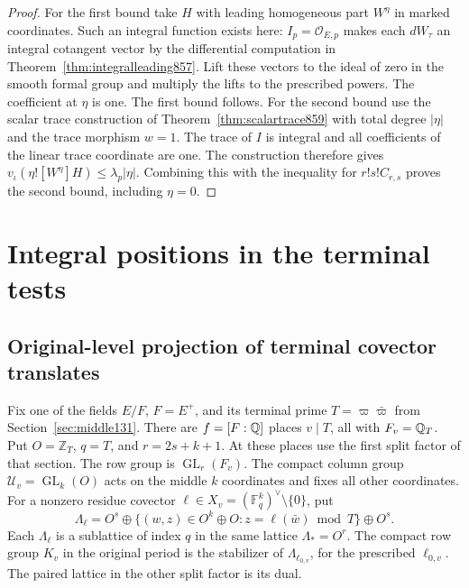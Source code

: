 \documentclass[a4paper,11pt]{article}
\theoremstyle{definition}
\theoremstyle{remark}
\newcommand{\ZZ}{\mathbb Z}\newcommand{\ord}{\operatorname{ord}}
\numberwithin{equation}{section}
\newcommand{\GL}{\operatorname{GL}}
\begin{document}
\begin{proof}
For the first bound take \(H\) with leading homogeneous part
\(W^\eta\) in marked coordinates. Such an integral function
exists here: \(I_p=\mathcal O_{E,p}\) makes each \(dW_\tau\)
an integral cotangent vector by the differential computation in
Theorem~\ref{thm:integralleading857}. Lift these vectors to the
ideal of zero in the smooth formal group and multiply the lifts
to the prescribed powers. The coefficient at \(\eta\) is one.
The first bound follows. For the second bound use the scalar
trace construction of Theorem~\ref{thm:scalartrace859} with
total degree \(|\eta|\) and the trace morphism \(w=1\).
The trace of \(I\) is integral and all coefficients of the
linear trace coordinate are one. The construction therefore
gives \(v_\iota(\eta![W^\eta]H)\le\lambda_p|\eta|\).
Combining this with the inequality for \(r!s!C_{r,s}\) proves
the second bound, including \(\eta=0\).
\end{proof}
\clearpage

\section{Integral positions in the terminal tests}\label{nav:g-VIII-4}

\subsection{Original-level projection of terminal covector translates}\label{nav:VIII-13}
\label{sec:terminal199}

Fix one of the fields \(E/F\), \(F=E^+\), and its terminal prime
\(T=\varpi\bar\varpi\) from Section~\ref{sec:middle131}.
There are \(f=[F:\mathbb Q]\) places \(v\mid T\), all with
\(F_v=\mathbb Q_T\). Put \(O=\ZZ_T\), \(q=T\), and \(r=2s+k+1\).
At these places use the first split factor of that section. The
row group is \(\GL_r(F_v)\). The compact column group
\(\mathcal U_v=\GL_k(O)\) acts on the middle \(k\) coordinates
and fixes all other coordinates. For a nonzero residue covector
\(\ell\in X_v=(\mathbb F_q^k)^\vee\setminus\{0\}\), put
\[
 \Lambda_\ell=O^s\oplus
       \{(w,z)\in O^k\oplus O:z=\ell(\bar w)\bmod T\}
                  \oplus O^s .
\]
Each \(\Lambda_\ell\) is a sublattice of index \(q\) in the
same lattice \(\Lambda_*=O^r\). The compact row group \(K_v\)
in the original period is the stabilizer of
\(\Lambda_{\ell_{0,v}}\), for the prescribed \(\ell_{0,v}\).
The paired lattice in the other split factor is its dual.
\end{document}
